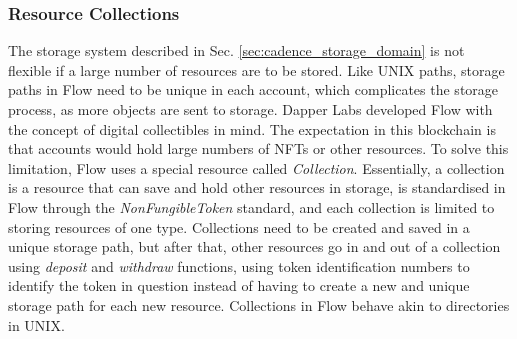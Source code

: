 \documentclass[../NFTComp_IEEE.tex]{subfiles}
\begin{document}
\subsubsection{Resource Collections}
\label{sec:resource_collections}
The storage system described in Sec. \ref{sec:cadence_storage_domain} is not flexible if a large number of resources are to be stored. Like UNIX paths, storage paths in Flow need to be unique in each account, which complicates the storage process, as more objects are sent to storage. Dapper Labs developed Flow with the concept of digital collectibles in mind. The expectation in this blockchain is that accounts would hold large numbers of NFTs or other resources. To solve this limitation, Flow uses a special resource called \textit{Collection}. Essentially, a collection is a resource that can save and hold other resources in storage, is standardised in Flow through the \textit{NonFungibleToken} standard, and each collection is limited to storing resources of one type. Collections need to be created and saved in a unique storage path, but after that, other resources go in and out of a collection using \textit{deposit} and \textit{withdraw} functions, using token identification numbers to identify the token in question instead of having to create a new and unique storage path for each new resource. Collections in Flow behave akin to directories in UNIX.
\end{document}
